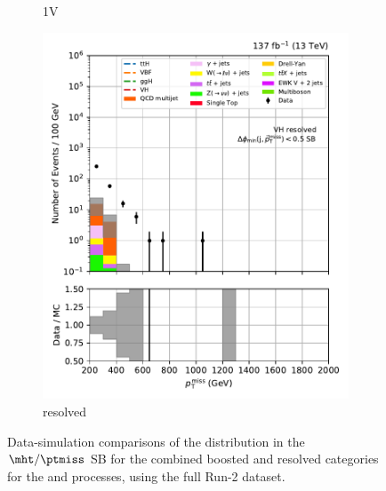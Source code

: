 \begin{figure}[htbp]
\begin{subfigure}[b]{0.24\textwidth}
        \caption{\VH 1V}
    \end{subfigure}
    \hfill
    \begin{subfigure}[b]{0.24\textwidth}
        \includegraphics[width=\textwidth]{figures/region_plots/full_Run2/sideband_2/VH_resolved.pdf}
        \caption{\VH resolved}
    \end{subfigure}
    \caption[Data-simulation comparisons of the \ptmiss distribution in the $\mht/\ptmiss$ sideband for the combined boosted and resolved categories for the \ttH and \VH processes, using the full Run-2 dataset]{Data-simulation comparisons of the \ptmiss distribution in the $\mht/\ptmiss$ \gls{SB} for the combined boosted and resolved categories for the \ttH and \VH processes, using the full Run-2 dataset.}
    \label{fig:htoinv_sb_yields_comb2016to18_mht_met}
\end{figure}

